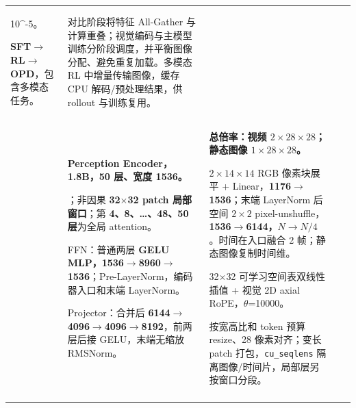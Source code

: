 \begin{longtable}{@{}P{0.130\dimexpr\textwidth-40pt\relax}P{0.235\dimexpr\textwidth-40pt\relax}P{0.300\dimexpr\textwidth-40pt\relax}P{0.245\dimexpr\textwidth-40pt\relax}P{0.090\dimexpr\textwidth-40pt\relax}@{}}
10^{-5}\)。\par{} {\bfseries SFT\(\rightarrow\)RL\(\rightarrow\)OPD}，包含多模态任务。 & 对比阶段将特征 All-\allowbreak{}Gather 与计算重叠；视觉编码与主模型训练分阶段调度，并平衡图像分配、避免重复加载。多模态 RL 中增量传输图像，缓存 CPU 解码/\allowbreak{}预处理结果，供 rollout 与训练复用。 \\
 & {\bfseries Perception Encoder，1.\allowbreak{}8B，50 层、宽度 1536。}\par{}；非因果 {\bfseries 32\(\times\)32 patch 局部窗口}；第 {\bfseries 4、8、…、48、50 层}为全局 attention。\par\vspace{1pt}FFN：普通两层 {\bfseries GELU MLP，1536\(\rightarrow\)8960\(\rightarrow\)1536}；Pre-\allowbreak{}LayerNorm，编码器入口和末端 LayerNorm。\par\vspace{1pt}Projector：合并后 {\bfseries 6144\(\rightarrow\)4096\(\rightarrow\)4096\(\rightarrow\)8192}，前两层后接 GELU，末端无缩放 RMSNorm。 & {\bfseries 总倍率：视频 \(2\times 28\times 28\)；静态图像 \(1\times 28\times 28\)。}\par{}\(2\times 14\times 14\) RGB 像素块展平 + Linear，{\bfseries 1176\(\rightarrow\)1536}；末端 LayerNorm 后空间 \(2\times 2\) pixel-\allowbreak{}unshuffle，{\bfseries 1536\(\rightarrow\)6144，\(N\rightarrow N/4\)}。时间在入口融合 2 帧；静态图像复制时间维。\par\vspace{1pt}{\bfseries 位置：}32\(\times\)32 可学习空间表双线性插值 + 视觉 2D axial RoPE，\(\theta\)=\allowbreak{}10000。\par\vspace{1pt}{\bfseries 动态分辨率：是。} 按宽高比和 token 预算 resize、28 像素对齐；变长 patch 打包，\texttt{cu\_\allowbreak{}seqlens} 隔离图像/\allowbreak{}时间片，局部层另按窗口分段。 & \textemdash{}\textemdash{} & \textemdash{}\textemdash{} \\
\addlinespace[6pt]

\end{longtable}
